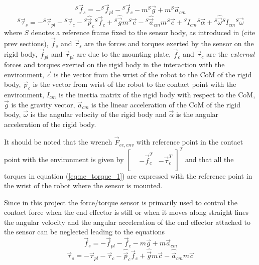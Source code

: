 \begin{equation}
  {}^S \vec{f}_{s} = -{}^S \vec{f}_{pl} -{}^S \vec{f}_{c} -m {}^S \vec{g} + m {}^S \vec{a}_{cm}
\end{equation}
\begin{equation}\label{eq:ne_torque_1}
  {}^S \vec{\tau}_{s} = -{}^S \vec{\tau}_{pl} -{}^S \vec{\tau}_{c} -{}^S \hat{\vec{p}}_{c} {}^S \vec{f}_{c}
  +{}^S \hat{\vec{g}} m{}^S\vec{c} - {}^S \hat{\vec{a}}_{cm} m {}^S \vec{c} + {}^S I_{cm} {}^S\vec{\alpha} 
  +{}^S \hat{\vec{\omega}} {}^S I_{cm} {}^S \vec{\omega}
\end{equation}
where $S$ denotes a reference frame fixed to the sensor body, as introduced in (cite prev sections),
$\vec{f}_{s}$ and $\vec{\tau}_{s}$ are the forces and torques exerted by the sensor on the rigid body,
$\vec{f}_{pl}$ and $\vec{\tau}_{pl}$ are due to the mounting plate,
$\vec{f}_{c}$ and $\vec{\tau}_{c}$ are the \emph{external} forces and torques exerted on the rigid body in the interaction
with the environment,
$\vec{c}$ is the vector from the wrist of the robot to the CoM of the rigid body,
$\vec{p}_{c}$ is the vector from wrist of the robot to the contact point with the environment,
$I_{cm}$ is the inertia matrix of the rigid body with respect to the CoM,
$\vec{g}$ is the gravity vector, $\vec{a}_{cm}$ is the linear acceleration of the CoM of the rigid body,
$\vec{\omega}$ is the angular velocity of the rigid body and
$\vec{\alpha}$ is the angular acceleration of the rigid body.
\par
It should be noted that the wrench $\vec{F}_{ee,env}$ with reference point in the contact point with the environment is given by
$\begin{bmatrix}
  & -\vec{f}_{c} ^T & - \vec{\tau}_{c} ^ T \\
\end{bmatrix}^T$
and that all the torques in equation (\ref{eq:ne_torque_1}) are expressed with the reference point in the wrist
of the robot where the sensor is mounted.
\par
Since in this project the force/torque sensor is primarily used to control the contact force when the end effector
is still or when it moves along straight lines the angular velocity and the angular acceleration of the end effector
attached to the sensor can be neglected leading to the equations
\begin{equation}\label{eq:ne_force_2}
   \vec{f}_{s} = - \vec{f}_{pl} - \vec{f}_{c} -m  \vec{g} + m  \vec{a}_{cm}
\end{equation}
\begin{equation}\label{eq:ne_torque_2}
   \vec{\tau}_{s} = - \vec{\tau}_{pl} - \vec{\tau}_{c} - \hat{\vec{p}}_{c}  \vec{f}_{c}
  + \hat{\vec{g}} m\vec{c} -  \hat{\vec{a}}_{cm} m  \vec{c}
\end{equation}

